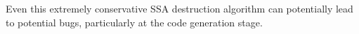 Even this extremely conservative SSA destruction algorithm
can potentially lead to potential bugs,
particularly at the code generation stage.


 

